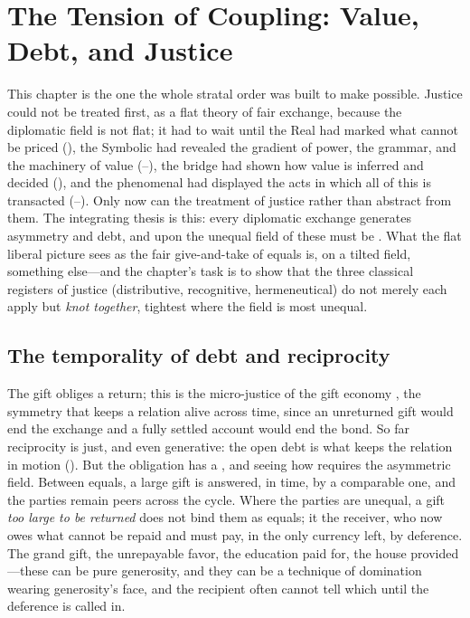 \section{The Tension of Coupling: Value, Debt, and Justice}\label{p07:sec:justice}

This chapter is the one the whole stratal order was built to make possible. Justice could not be treated first, as a flat theory of fair exchange, because the diplomatic field is not flat; it had to wait until the Real had marked what cannot be priced (), the Symbolic had revealed the gradient of power, the grammar, and the machinery of value (--), the bridge had shown how value is inferred and decided (), and the phenomenal had displayed the acts in which all of this is transacted (--). Only now can the treatment of justice  rather than abstract from them. The integrating thesis is this: every diplomatic exchange generates asymmetry and debt, and upon the unequal field of  these must be . What the flat liberal picture sees as the fair give-and-take of equals is, on a tilted field, something else---and the chapter's task is to show that the three classical registers of justice (distributive, recognitive, hermeneutical) do not merely each apply but \emph{knot together}, tightest where the field is most unequal.

\subsection{The temporality of debt and reciprocity}
The gift obliges a return; this is the micro-justice of the gift economy \parencite{mauss1925gift,graeber2011debt}, the symmetry that keeps a relation alive across time, since an unreturned gift would end the exchange and a fully settled account would end the bond. So far reciprocity is just, and even generative: the open debt is what keeps the relation in motion (). But the obligation has a , and seeing how requires the asymmetric field. Between equals, a large gift is answered, in time, by a comparable one, and the parties remain peers across the cycle. Where the parties are unequal, a gift \emph{too large to be returned} does not bind them as equals; it  the receiver, who now owes what cannot be repaid and must pay, in the only currency left, by deference. The grand gift, the unrepayable favor, the education paid for, the house provided---these can be pure generosity, and they can be a technique of domination wearing generosity's face, and the recipient often cannot tell which until the deference is called in.

